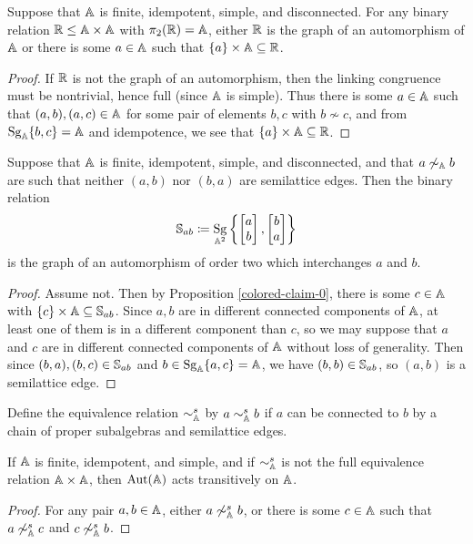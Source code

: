 \documentclass[letterpaper,11pt]{article}
\DeclareMathOperator{\Sg}{Sg}
\DeclareMathOperator{\Aut}{Aut}
\begin{document}
\begin{prop}\label{colored-claim-0} Suppose that $\mathbb{A}$ is finite, idempotent, simple, and disconnected. For any binary relation $\mathbb{R} \le \mathbb{A} \times \mathbb{A}$ with $\pi_2(\mathbb{R}) = \mathbb{A}$, either $\mathbb{R}$ is the graph of an automorphism of $\mathbb{A}$ or there is some $a \in \mathbb{A}$ such that $\{a\} \times \mathbb{A} \subseteq \mathbb{R}$.
\end{prop}
\begin{proof} If $\mathbb{R}$ is not the graph of an automorphism, then the linking congruence must be nontrivial, hence full (since $\mathbb{A}$ is simple). Thus there is some $a \in \mathbb{A}$ such that $(a,b),(a,c) \in \mathbb{A}$ for some pair of elements $b,c$ with $b \not\sim c$, and from $\Sg_{\bA}\{b,c\} = \bA$ and idempotence, we see that $\{a\}\times \mathbb{A} \subseteq \mathbb{R}$.
\end{proof}

\begin{prop}\label{colored-claim-1} Suppose that $\mathbb{A}$ is finite, idempotent, simple, and disconnected, and that $a \not\sim_{\mathbb{A}} b$ are such that neither $(a,b)$ nor $(b,a)$ are semilattice edges. Then the binary relation
\[
\bS_{ab} \coloneqq \Sg_{\bA^2}\left\{\begin{bmatrix} a\\ b\end{bmatrix}, \begin{bmatrix} b\\ a\end{bmatrix}\right\}
\]
is the graph of an automorphism of order two which interchanges $a$ and $b$.
\end{prop}
\begin{proof} Assume not. Then by Proposition \ref{colored-claim-0}, there is some $c \in \mathbb{A}$ with $\{c\}\times \mathbb{A} \subseteq \mathbb{S}_{ab}$. Since $a,b$ are in different connected components of $\mathbb{A}$, at least one of them is in a different component than $c$, so we may suppose that $a$ and $c$ are in different connected components of $\mathbb{A}$ without loss of generality. Then since $(b,a), (b,c) \in \mathbb{S}_{ab}$ and $b \in \Sg_{\bA}\{a,c\} = \bA$, we have $(b,b) \in \mathbb{S}_{ab}$, so $(a,b)$ is a semilattice edge.
\end{proof}

\begin{defn} Define the equivalence relation $\sim^s_{\mathbb{A}}$ by $a \sim^s_{\mathbb{A}} b$ if $a$ can be connected to $b$ by a chain of proper subalgebras and semilattice edges.
\end{defn}

\begin{cor}\label{colored-claim-1-cor} If $\mathbb{A}$ is finite, idempotent, and simple, and if $\sim^s_{\mathbb{A}}$ is not the full equivalence relation $\mathbb{A} \times \mathbb{A}$, then $\Aut(\bA)$ acts transitively on $\mathbb{A}$.
\end{cor}
\begin{proof} For any pair $a,b \in \mathbb{A}$, either $a \not\sim^s_{\mathbb{A}} b$, or there is some $c \in \mathbb{A}$ such that $a \not\sim^s_{\mathbb{A}} c$ and $c \not\sim^s_{\mathbb{A}} b$.
\end{proof}
\end{document}
